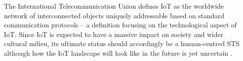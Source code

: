 The International Telecommunication Union defines IoT as the worldwide network of interconnected objects uniquely addressable based on standard communication protocols -- a definition focusing on the technological aspect of IoT. 
Since IoT is expected to have a massive impact on society and wider cultural milieu, its ultimate status should accordingly be a human-centred STS although how the IoT landscape will look like in the future is yet uncertain \cite{atzori2014smart,guo2012opportunistic,ning2011future,Shin2014,tomasini2017effect}. 
%
%

